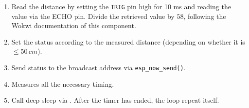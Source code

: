 \documentclass{article}
\begin{document}
\begin{enumerate}
    \begin{enumerate}
        \item Read the distance by setting the \texttt{TRIG} pin high for 10 ms and reading the value via the ECHO pin. Divide the retrieved value by $58$, following the Wokwi documentation of this component.
        \item Set the status according to the measured distance (depending on whether it is $\leq 50\,cm$).
        \item Send status to the broadcast address via \verb|esp_now_send()|.
        \item Measures all the necessary timing.
        \item Call deep sleep via . After the timer has ended, the loop repeat itself.
    \end{enumerate}
\end{enumerate}
\end{document}
